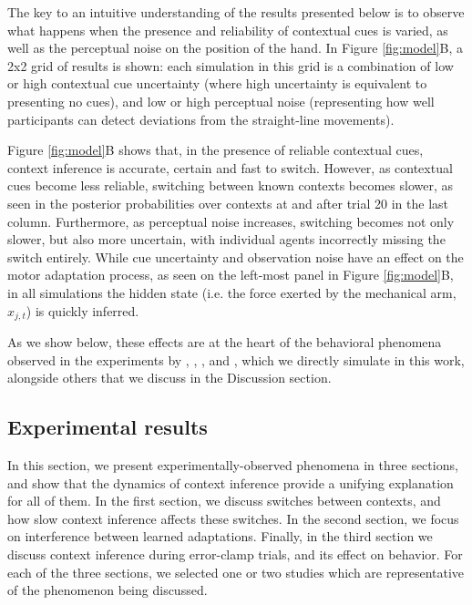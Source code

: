 \documentclass[a4paper,doc,floatsintext,natbib]{apa6}
\def \fref #1{Figure \ref{#1}}     %
\begin{document}
The key to an intuitive understanding of the results presented below is to observe what happens when the presence and reliability of contextual cues is varied, as well as the perceptual noise on the position of the hand. In \fref{fig:model}B, a 2x2 grid of results is shown: each simulation in this grid is a combination of low or high contextual cue uncertainty (where high uncertainty is equivalent to presenting no cues), and low or high perceptual noise (representing how well participants can detect deviations from the straight-line movements).

\fref{fig:model}B shows that, in the presence of reliable contextual cues, context inference is accurate, certain and fast to switch. However, as contextual cues become less reliable, switching between known contexts becomes slower, as seen in the posterior probabilities over contexts at and after trial 20 in the last column. Furthermore, as perceptual noise increases, switching becomes not only slower, but also more uncertain, with individual agents incorrectly missing the switch entirely. While cue uncertainty and observation noise have an effect on the motor adaptation process, as seen on the left-most panel in \fref{fig:model}B, in all simulations the hidden state (i.e. the force exerted by the mechanical arm, $x_{j,t}$) is quickly inferred.

As we show below, these effects are at the heart of the behavioral phenomena observed in the experiments by \cite{Kim_Neural_2015}, \cite{Oh_Minimizing_2019}, \cite{Davidson_Scaling_2004}, and \cite{Vaswani_Decay_2013}, which we directly simulate in this work, alongside others that we discuss in the Discussion section.


\subsection{Experimental results}
In this section, we present experimentally-observed phenomena in three sections, and show that the dynamics of context inference provide a unifying explanation for all of them. In the first section, we discuss switches between contexts, and how slow context inference affects these switches. In the second section, we focus on interference between learned adaptations. Finally, in the third section we discuss context inference during error-clamp trials, and its effect on behavior. For each of the three sections, we selected one or two studies which are representative of the phenomenon being discussed.
\end{document}
